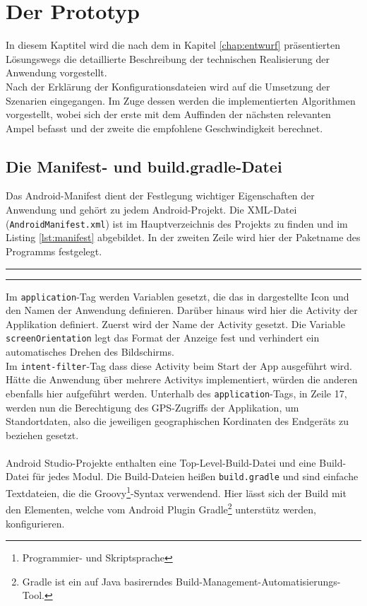 \chapter{\label{chap:implementierung}Der Prototyp}
In diesem Kaptitel wird die nach dem in Kapitel \ref{chap:entwurf} präsentierten Lösungswegs die detaillierte Beschreibung der technischen Realisierung der Anwendung vorgestellt.\\
Nach der Erklärung der Konfigurationsdateien wird auf die Umsetzung der Szenarien eingegangen. Im Zuge dessen werden die implementierten Algorithmen vorgestellt, wobei sich der erste mit dem Auffinden der nächsten relevanten Ampel befasst und der zweite die empfohlene Geschwindigkeit berechnet.
%
%
\section{Die Manifest- und build.gradle-Datei}
Das Android-Manifest dient der Festlegung wichtiger Eigenschaften der Anwendung und gehört zu jedem Android-Projekt. Die \gls{XML}-Datei (\texttt{AndroidManifest.xml}) ist im Hauptverzeichnis des Projekts zu finden und im Listing \ref{lst:manifest} abgebildet. In der zweiten Zeile wird hier der Paketname des Programms festgelegt. 
\begin{center}
\rule{35em}{0.5pt} 
 \rule{35em}{0.5pt}
\end{center}
Im \texttt{application}-Tag werden Variablen gesetzt, die das in dargestellte Icon und den Namen der Anwendung definieren. Darüber hinaus wird hier die \gls{Activity} der Applikation definiert. Zuerst wird der Name der \gls{Activity} gesetzt. Die Variable \texttt{screenOrientation} legt das Format der Anzeige fest und verhindert ein automatisches Drehen des Bildschirms. \\
Im \texttt{intent-filter}-Tag dass diese Activity beim Start der App ausgeführt wird. Hätte die Anwendung über mehrere \glspl{Activity} implementiert, würden die anderen ebenfalls hier aufgeführt werden.
Unterhalb des \texttt{application}-Tags, in Zeile 17, werden nun die Berechtigung des \gls{GPS}-Zugriffs der Applikation, um Standortdaten, also die jeweiligen geographischen Kordinaten des Endgeräts zu beziehen gesetzt.\\\\
Android Studio-Projekte enthalten eine Top-Level-Build-Datei und eine Build-Datei für jedes Modul. Die Build-Dateien heißen \texttt{build.gradle} und sind einfache Textdateien, die die Groovy\footnote{ Programmier- und Skriptsprache}-Syntax verwendend. Hier lässt sich der Build mit den Elementen, welche vom Android Plugin Gradle\footnote{ Gradle ist ein auf Java basirerndes Build-Management-Automatisierungs-Tool.} unterstütz werden, konfigurieren. \cite{android_build} \\ 
